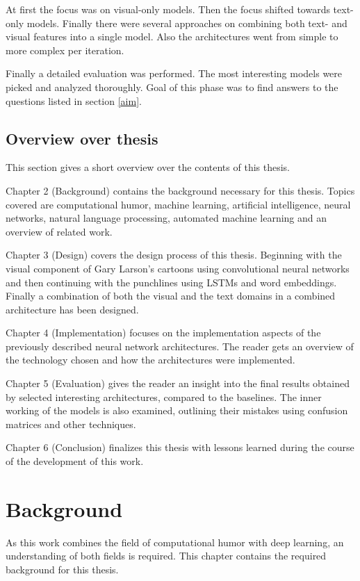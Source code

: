 \documentclass[draft,final,oneside]{vutinfth} %
\begin{document}
At first the focus was on visual-only models. Then the focus shifted towards text-only models. Finally there were several approaches on combining both text- and visual features into a single model. Also the architectures went from simple to more complex per iteration.

Finally a detailed evaluation was performed. The most interesting models were picked and analyzed thoroughly. Goal of this phase was to find answers to the questions listed in section \ref{aim}.
\pagebreak
\section{Overview over thesis}
This section gives a short overview over the contents of this thesis.

Chapter 2 (Background) contains the background necessary for this thesis. Topics covered are computational humor, machine learning, artificial intelligence, neural networks, natural language processing, automated machine learning and an overview of related work.

Chapter 3 (Design) covers the design process of this thesis. Beginning with the visual component of Gary Larson's cartoons using convolutional neural networks and then continuing with the punchlines using LSTMs and word embeddings. Finally a combination of both the visual and the text domains in a combined architecture has been designed.

Chapter 4 (Implementation) focuses on the implementation aspects of the previously described neural network architectures. The reader gets an overview of the technology chosen and how the architectures were implemented.

Chapter 5 (Evaluation) gives the reader an insight into the final results obtained by selected interesting architectures, compared to the baselines. The inner working of the models is also examined, outlining their mistakes using confusion matrices and other techniques.

Chapter 6 (Conclusion) finalizes this thesis with lessons learned during the course of the development of this work. 


\chapter{Background}

As this work combines the field of computational humor with deep learning, an understanding of both fields is required. This chapter contains the required background for this thesis.
\end{document}
